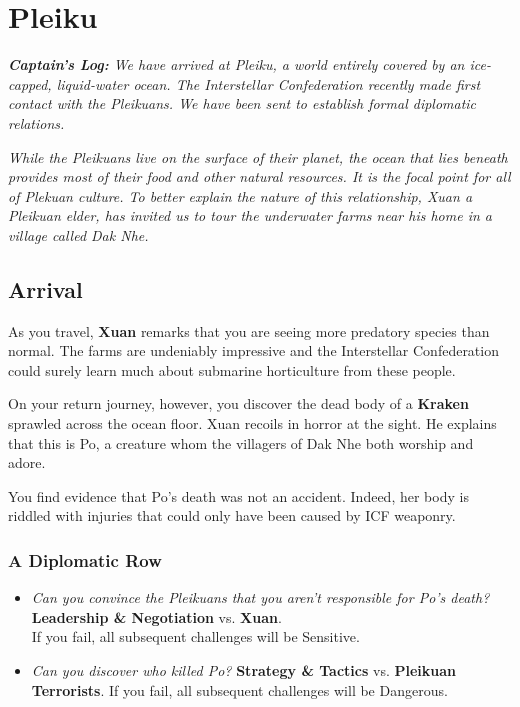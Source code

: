 \documentclass[11pt, a5paper, parskip=half-, DIV=12]{scrartcl}
\begin{document}
\section*{Pleiku}
\textit{\textbf{Captain's Log:} We have arrived at Pleiku, a world entirely covered by an ice-capped, liquid-water ocean. The Interstellar Confederation recently made first contact with the Pleikuans. We have been sent to establish formal diplomatic relations.}

\textit{While the Pleikuans live on the surface of their planet, the ocean that lies beneath provides most of their food and other natural resources. It is the focal point for all of Plekuan culture. To better explain the nature of this relationship, Xuan \textendash{} a Pleikuan elder, has invited us to tour the underwater farms near his home in a village called Dak Nhe.}

\subsection*{Arrival}
As you travel, \textbf{Xuan} remarks that you are seeing more predatory species than normal. The farms are undeniably impressive and the Interstellar Confederation could surely learn much about submarine horticulture from these people. 

On your return journey, however, you discover the dead body of a \textbf{Kraken} sprawled across the ocean floor. Xuan recoils in horror at the sight. He explains that this is Po, a creature whom the villagers of Dak Nhe both worship and adore.

You find evidence that Po's death was not an accident. Indeed, her body is riddled with injuries that could only have been caused by ICF weaponry. 

\subsubsection*{A Diplomatic Row}

\begin{itemize}
	\item \textit{Can you convince the Pleikuans that you aren't responsible for Po's death?} \textbf{Leadership \& Negotiation} vs. \textbf{Xuan}. \\ If you fail, all subsequent challenges will be Sensitive.
	\item \textit{Can you discover who killed Po?} \textbf{Strategy \& Tactics} vs. \textbf{Pleikuan Terrorists}. If you fail, all subsequent challenges will be Dangerous.  
\end{itemize}
\end{document}
